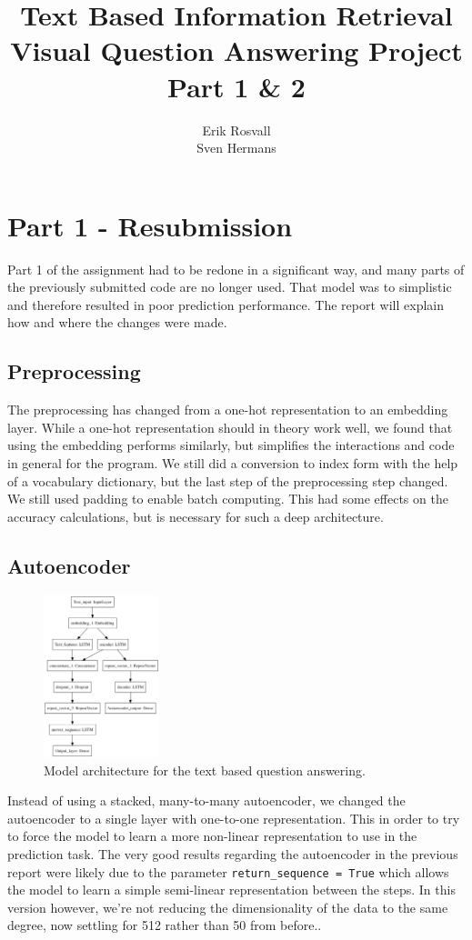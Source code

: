 \documentclass[10pt,a4paper]{report}
\author{Erik Rosvall \\ Sven Hermans}
\title{Text Based Information Retrieval \\ Visual Question Answering Project \\ Part 1 \& 2}
\begin{document}
	\maketitle
	\section*{Part 1 - Resubmission}
		Part 1 of the assignment had to be redone in a significant way, and many parts of the previously submitted code are no longer used. That model was to simplistic and therefore resulted in poor prediction performance. The report will explain how and where the changes were made.
	\subsection*{Preprocessing}
		The preprocessing has changed from a one-hot representation to an embedding layer. While a one-hot representation should in theory work well, we found that using the embedding performs similarly, but simplifies the interactions and code in general for the program. We still did a conversion to index form with the help of a vocabulary dictionary, but the last step of the preprocessing step changed. We still used padding to enable batch computing. This had some effects on the accuracy calculations, but is necessary for such a deep architecture.
	\subsection*{Autoencoder}
		\begin{figure}
		\begin{center}
			\includegraphics[width=0.3\textwidth]{text_classifier_w_autoencoder.png}
		\end{center}
		\caption{Model architecture for the text based question answering. \label{text_classifier_w_autoencoder}}
	\end{figure}
	Instead of using a stacked, many-to-many autoencoder, we changed the autoencoder to a single layer with one-to-one representation. This in order to try to force the model to learn a more non-linear representation to use in the prediction task. The very good results regarding the autoencoder in the previous report were likely due to the parameter \texttt{return\_sequence = True} which allows the model to learn a simple semi-linear representation between the steps. In this version however, we're not reducing the dimensionality of the data to the same degree, now settling for 512 rather than 50 from before..
\end{document}
